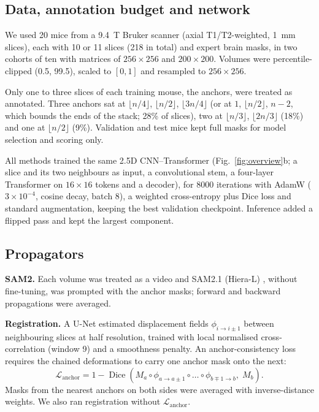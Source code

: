 \subsection{Data, annotation budget and network}

We used 20 mice from a 9.4~T Bruker scanner (axial T1/T2-weighted, 1~mm slices), each with 10 or 11 slices (218 in total) and expert brain masks, in two cohorts of ten with matrices of $256\times256$ and $200\times200$. Volumes were percentile-clipped (0.5, 99.5), scaled to $[0,1]$ and resampled to $256\times256$.

Only one to three slices of each training mouse, the anchors, were treated as annotated. Three anchors sat at $\lfloor n/4\rfloor$, $\lfloor n/2\rfloor$, $\lfloor 3n/4\rfloor$ (or at $1$, $\lfloor n/2\rfloor$, $n-2$, which bounds the ends of the stack; 28\% of slices), two at $\lfloor n/3\rfloor$, $\lfloor 2n/3\rfloor$ (18\%) and one at $\lfloor n/2\rfloor$ (9\%). Validation and test mice kept full masks for model selection and scoring only.

All methods trained the same 2.5D CNN--Transformer (Fig.~\ref{fig:overview}b; a slice and its two neighbours as input, a convolutional stem, a four-layer Transformer on $16\times16$ tokens and a decoder), for 8000 iterations with AdamW ($3\times10^{-4}$, cosine decay, batch 8), a weighted cross-entropy plus Dice loss and standard augmentation, keeping the best validation checkpoint. Inference added a flipped pass and kept the largest component.

\subsection{Propagators}
\label{sec:prop}

\textbf{SAM2.} Each volume was treated as a video and SAM2.1 (Hiera-L) \cite{ravi2024sam2}, without fine-tuning, was prompted with the anchor masks; forward and backward propagations were averaged.

\textbf{Registration.} A U-Net estimated displacement fields $\phi_{i\to i\pm1}$ between neighbouring slices at half resolution, trained with local normalised cross-correlation (window 9) and a smoothness penalty. An anchor-consistency loss requires the chained deformations to carry one anchor mask onto the next:
\begin{equation}
\mathcal{L}_{\text{anchor}} = 1 - \operatorname{Dice}\!\left(M_a \circ \phi_{a\to a\pm1} \circ \dots \circ \phi_{b\mp1\to b},\; M_b\right).
\end{equation}
Masks from the nearest anchors on both sides were averaged with inverse-distance weights. We also ran registration without $\mathcal{L}_{\text{anchor}}$.

